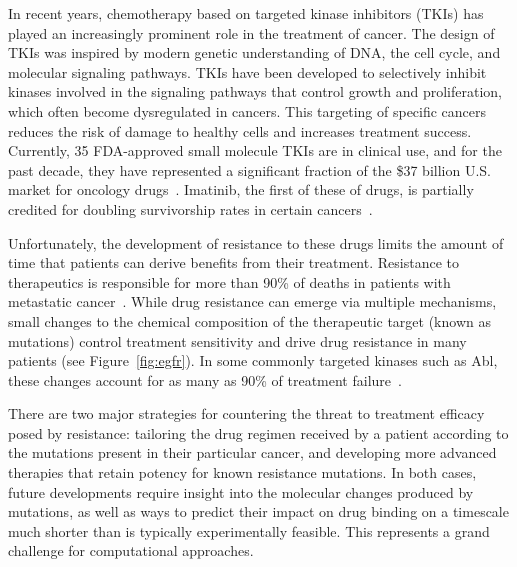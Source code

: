 
In recent years, chemotherapy based on targeted kinase inhibitors (TKIs) has
played an increasingly prominent role in the treatment of cancer. The design
of TKIs was inspired by modern genetic understanding of DNA, the cell cycle,
and molecular signaling pathways. TKIs have been developed to selectively
inhibit kinases involved in the signaling pathways that control growth and
proliferation, which often become dysregulated in cancers. This targeting of
specific cancers reduces the risk of damage to healthy cells and increases
treatment success. Currently, 35 FDA-approved small molecule TKIs are in
clinical use, and for the past decade, they have represented a significant
fraction of the \$37 billion U.S. market for oncology drugs~\cite{FDA,
Zhao2014}. Imatinib, the first of these of drugs, is partially credited for
doubling survivorship rates in certain cancers~\cite{Zhao2014, ACSreport}.

Unfortunately, the development of resistance to these drugs limits the amount
of time that patients can derive benefits from their treatment. Resistance to
therapeutics is responsible for more than 90\% of deaths in patients with
metastatic cancer~\cite{Longley2005}. While drug resistance can emerge via
multiple mechanisms, small changes to the chemical composition of the
therapeutic target (known as mutations) control treatment sensitivity and
drive drug resistance in many patients (see Figure~\ref{fig:egfr}). In some
commonly targeted kinases such as Abl, these changes account for as many as
90\% of treatment failure~\cite{Shah2002}.


There are two major strategies for countering the threat to treatment
efficacy posed by resistance: tailoring the drug regimen received by a
patient according to the mutations present in their particular cancer, and
developing more advanced %
therapies that retain potency for known resistance mutations. In both cases,
future developments require insight into the molecular changes produced by
mutations, as well as ways to predict their impact on drug binding on a
timescale much shorter than is typically experimentally feasible. This
represents a grand challenge for computational approaches.

